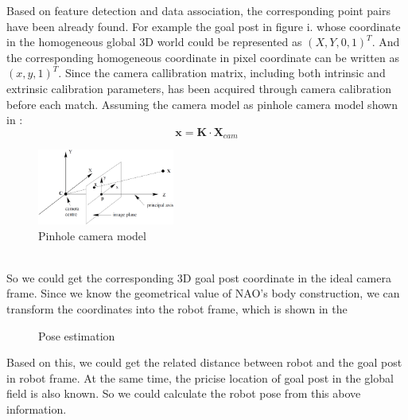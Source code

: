 Based on feature detection and data association, the corresponding point pairs have been already found. For example the goal post in figure i. whose coordinate in the homogeneous global 3D world could be represented as $(X,Y,0,1)^T$. And the corresponding homogeneous coordinate in pixel coordinate can be written as $(x,y,1)^T$. Since the camera callibration matrix, including both intrinsic and extrinsic calibration parameters, has been acquired through camera calibration before each match. Assuming the camera model as pinhole camera model shown in  \cite{hartley2003multiple}: 
\[ %
\mathbf{x} = \mathbf{K} \cdot \mathbf{X}_{cam}
\]
\begin{figure}[!htb]
    \includegraphics[width=0.4\textwidth]{pics/cameramodel.png}
    \centering
    \caption{Pinhole camera model}
    \label{fig: camera}
\end{figure}\\

So we could get the corresponding 3D goal post coordinate in the ideal camera frame. Since we know the geometrical value of NAO's body construction, we can transform the coordinates into the robot frame, which is shown in the 
\begin{figure}[tbp]
\centering
{}
\caption{Pose estimation}
\label{fig: trans}
\end{figure}
Based on this, we could get the related distance between robot and the goal post in robot frame. At the same time, the pricise location of goal post in the global field is also known. So we could calculate the robot pose from this above information. %
